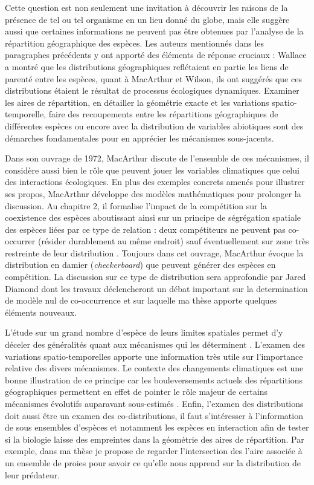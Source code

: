 Cette question est non seulement une invitation à découvrir les raisons
de la présence de tel ou tel organisme en un lieu donné du globe, mais
elle suggère aussi que certaines informations ne peuvent pas être
obtenues par l'analyse de la répartition géographique des espèces. Les
auteurs mentionnés dans les paragraphes précédents y ont apporté des
éléments de réponse cruciaux : Wallace a montré que les distributions
géographiques reflétaient en partie les liens de parenté entre les
espèces, quant à MacArthur et Wilson, ils ont suggérés que ces
distributions étaient le résultat de processus écologiques dynamiques.
Examiner les aires de répartition, en détailler la géométrie exacte et
les variations spatio-temporelle, faire des recoupements entre les
répartitions géographiques de différentes espèces ou encore avec la
distribution de variables abiotiques sont des démarches fondamentales
pour en apprécier les mécanismes sous-jacents.

Dans son ouvrage de 1972, MacArthur discute de l'ensemble de ces
mécanismes, il considère aussi bien le rôle que peuvent jouer les
variables climatiques que celui des interactions écologiques. En plus
des exemples concrets amenés pour illustrer ses propos, MacArthur
développe des modèles mathématiques pour prolonger la discussion. Au
chapitre 2, il formalise l'impact de la compétition sur la coexistence
des espèces aboutissant ainsi sur un principe de ségrégation spatiale
des espèces liées par ce type de relation : deux compétiteurs ne peuvent
pas co-occurrer (résider durablement au même endroit) sauf
éventuellement sur zone très restreinte de leur distribution
\citep{macarthur1972geographical}. Toujours dans cet ouvrage, MacArthur
évoque la distribution en damier (\emph{checkerboard}) que peuvent
générer des espèces en compétition. La discussion sur ce type de
distribution sera approfondie par Jared Diamond \citep{Diamond1975} dont
les travaux déclencheront un débat important sur la determination de
modèle nul de co-occurrence \citep{Connor1979} et sur laquelle ma thèse
apporte quelques éléments nouveaux.

L'étude sur un grand nombre d'espèce de leurs limites spatiales permet
d'y déceler des généralités quant aux mécanismes qui les déterminent
\citep{macarthur1972geographical}. L'examen des variations
spatio-temporelles apporte une information très utile sur l'importance
relative des divers mécanismes. Le contexte des changements climatiques
est une bonne illustration de ce principe car les bouleversements
actuels des répartitions géographiques permettent en effet de pointer le
rôle majeur de certains mécanismes évolutifs auparavant sous-estimés
\citep{Lavergne2010}. Enfin, l'examen des distributions doit aussi être
un examen des co-distributions, il faut s'intéresser à l'information de
sous ensembles d'espèces et notamment les espèces en interaction afin de
tester si la biologie laisse des empreintes dans la géométrie des aires
de répartition. Par exemple, dans ma thèse je propose de regarder
l'intersection des l'aire associée à un ensemble de proies pour savoir
ce qu'elle nous apprend sur la distribution de leur prédateur.

